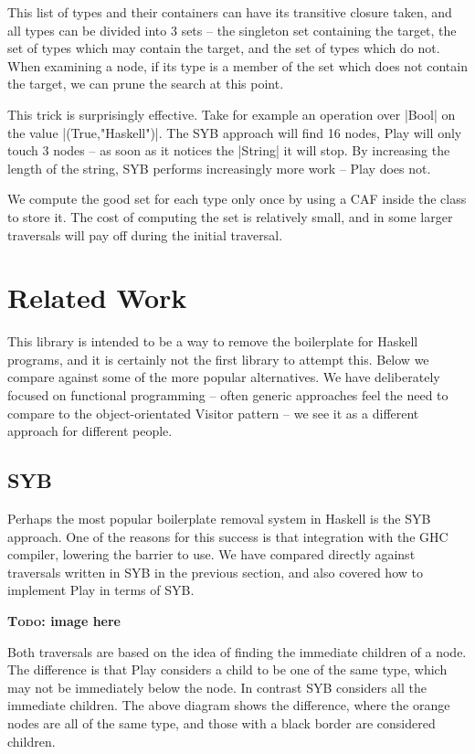 \documentclass[preprint]{sigplanconf}
\newcommand{\todo}[1]{\textbf{\textsc{Todo:} #1}}
\begin{document}
This list of types and their containers can have its transitive closure taken, and all types can be divided into 3 sets -- the singleton set containing the target, the set of types which may contain the target, and the set of types which do not. When examining a node, if its type is a member of the set which does not contain the target, we can prune the search at this point.

This trick is surprisingly effective. Take for example an operation over |Bool| on the value |(True,"Haskell")|. The SYB approach will find 16 nodes, Play will only touch 3 nodes -- as soon as it notices the |String| it will stop. By increasing the length of the string, SYB performs increasingly more work -- Play does not.

We compute the good set for each type only once by using a CAF inside the class to store it. The cost of computing the set is relatively small, and in some larger traversals will pay off during the initial traversal.


\section{Related Work}

This library is intended to be a way to remove the boilerplate for Haskell programs, and it is certainly not the first library to attempt this. Below we compare against some of the more popular alternatives. We have deliberately focused on functional programming -- often generic approaches feel the need to compare to the object-orientated Visitor pattern -- we see it as a different approach for different people.

\subsection{SYB}

Perhaps the most popular boilerplate removal system in Haskell is the SYB approach. One of the reasons for this success is that integration with the GHC compiler, lowering the barrier to use. We have compared directly against traversals written in SYB in the previous section, and also covered how to implement Play in terms of SYB.

\todo{image here}

Both traversals are based on the idea of finding the immediate children of a node. The difference is that Play considers a child to be one of the same type, which may not be immediately below the node. In contrast SYB considers all the immediate children. The above diagram shows the difference, where the orange nodes are all of the same type, and those with a black border are considered children.
\end{document}
